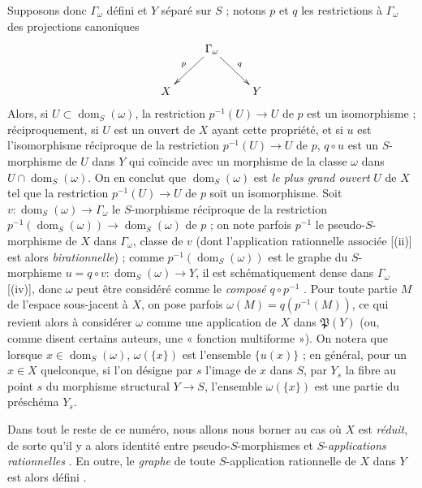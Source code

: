 \begin{env}[20.4.2]
\label{IV.20.4.2}
Supposons donc $\Gamma_\omega$ défini et $Y$ séparé sur $S$ ; notons $p$ et $q$ les restrictions à $\Gamma_\omega$ des projections canoniques
\[
  \xymatrix{
  & \Gamma_\omega \ar[dl]_p \ar[dr]^q & \\
  X & & Y
  }
\]
Alors, si $U\subset\operatorname{dom}_S(\omega)$, la restriction $p^{-1}(U)\to U$ de $p$ est un isomorphisme  ; réciproquement, si $U$ est un ouvert de $X$ ayant cette propriété, et si $u$ est l'isomorphisme réciproque de la restriction $p^{-1}(U)\to U$ de $p$, $q\circ u$ est un $S$-morphisme de $U$ dans $Y$ qui coïncide avec un morphisme de la classe $\omega$ dans $U\cap\operatorname{dom}_S(\omega)$.
On en conclut que $\operatorname{dom}_S(\omega)$ est \emph{le plus grand ouvert} $U$ de $X$ tel que la restriction $p^{-1}(U)\to U$ de $p$ soit un
isomorphisme.
Soit $v:\operatorname{dom}_S(\omega)\to\Gamma_\omega$ le $S$-morphisme réciproque de la restriction $p^{-1}(\operatorname{dom}_S(\omega))\to\operatorname{dom}_S(\omega)$ de $p$ ; on note parfois $p^{-1}$ le pseudo-$S$-morphisme de $X$ dans $\Gamma_\omega$, classe de $v$ (dont l'application rationnelle associée [(ii)] est alors \emph{birationnelle}) ; comme $p^{-1}(\operatorname{dom}_S(\omega))$ est le graphe du $S$-morphisme $u=q\circ v:\operatorname{dom}_S(\omega)\to Y$, il est schématiquement dense dans $\Gamma_\omega$ [(iv)], donc $\omega$ peut être considéré comme le \emph{composé} $q\circ p^{-1}$ .
Pour toute partie $M$ de l'espace sous-jacent à $X$, on pose parfois $\omega(M)=q(p^{-1}(M))$, ce qui revient alors à considérer $\omega$ comme une application de $X$ dans $\mathfrak{P}(Y)$ (ou, comme disent certains auteurs, une « fonction multiforme »).
On notera que lorsque $x\in\operatorname{dom}_S(\omega)$, $\omega(\{x\})$ est l'ensemble $\{u(x)\}$ ; en général, pour un $x\in X$ quelconque, si l'on désigne par $s$ l'image de $x$ dans $S$, par $Y_s$ la fibre au point $s$ du morphisme structural $Y\to S$, l'ensemble $\omega(\{x\})$ est une partie du préschéma $Y_s$.
\end{env}

\begin{env}[20.4.3]
\label{IV.20.4.3}
Dans tout le reste de ce numéro, nous allons nous borner au cas où $X$ est \emph{réduit}, de sorte qu'il y a alors identité entre pseudo-$S$-morphismes et $S$-\emph{applications rationnelles} .
En outre, le \emph{graphe} de toute $S$-application rationnelle de $X$ dans $Y$ est alors défini .
\end{env}


